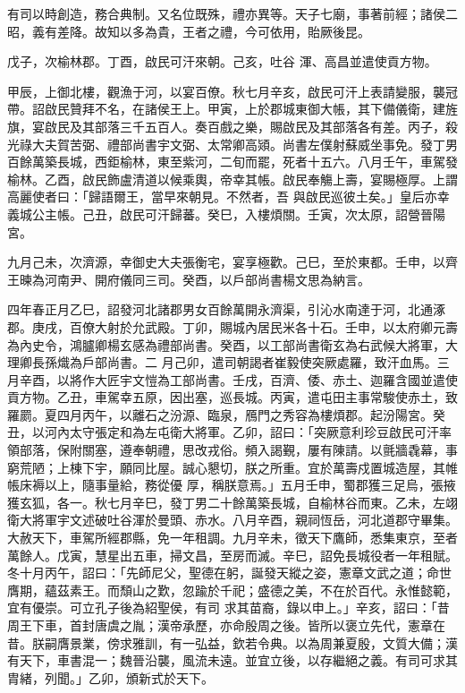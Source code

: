 \begin{pinyinscope}
 有司以時創造，務合典制。又名位既殊，禮亦異等。天子七廟，事著前經；諸侯二昭，義有差降。故知以多為貴，王者之禮，今可依用，貽厥後昆。



 戊子，次榆林郡。丁酉，啟民可汗來朝。己亥，吐谷
 渾、高昌並遣使貢方物。



 甲辰，上御北樓，觀漁于河，以宴百僚。秋七月辛亥，啟民可汗上表請變服，襲冠帶。詔啟民贊拜不名，在諸侯王上。甲寅，上於郡城東御大帳，其下備儀衛，建旌旗，宴啟民及其部落三千五百人。奏百戲之樂，賜啟民及其部落各有差。丙子，殺光祿大夫賀苦弼、禮部尚書宇文弼、太常卿高熲。尚書左僕射蘇威坐事免。發丁男百餘萬築長城，西鉅榆林，東至紫河，二旬而罷，死者十五六。八月壬午，車駕發榆林。乙酉，啟民飾盧清道以候乘輿，帝幸其帳。啟民奉觴上壽，宴賜極厚。上謂高麗使者曰：「歸語爾王，當早來朝見。不然者，吾
 與啟民巡彼土矣。」皇后亦幸義城公主帳。己丑，啟民可汗歸蕃。癸巳，入樓煩關。壬寅，次太原，詔營晉陽宮。



 九月己未，次濟源，幸御史大夫張衡宅，宴享極歡。己巳，至於東都。壬申，以齊王暕為河南尹、開府儀同三司。癸酉，以戶部尚書楊文思為納言。



 四年春正月乙巳，詔發河北諸郡男女百餘萬開永濟渠，引沁水南達于河，北通涿郡。庚戌，百僚大射於允武殿。丁卯，賜城內居民米各十石。壬申，以太府卿元壽為內史令，鴻臚卿楊玄感為禮部尚書。癸酉，以工部尚書衛玄為右武候大將軍，大理卿長孫熾為戶部尚書。二
 月己卯，遣司朝謁者崔毅使突厥處羅，致汗血馬。三月辛酉，以將作大匠宇文愷為工部尚書。壬戌，百濟、倭、赤土、迦羅含國並遣使貢方物。乙丑，車駕幸五原，因出塞，巡長城。丙寅，遣屯田主事常駿使赤土，致羅罽。夏四月丙午，以離石之汾源、臨泉，鴈門之秀容為樓煩郡。起汾陽宮。癸丑，以河內太守張定和為左屯衛大將軍。乙卯，詔曰：「突厥意利珍豆啟民可汗率領部落，保附關塞，遵奉朝禮，思改戎俗。頻入謁覲，屢有陳請。以氈牆毳幕，事窮荒陋；上棟下宇，願同比屋。誠心懇切，朕之所重。宜於萬壽戍置城造屋，其帷帳床褥以上，隨事量給，務從優
 厚，稱朕意焉。」五月壬申，蜀郡獲三足烏，張掖獲玄狐，各一。秋七月辛巳，發丁男二十餘萬築長城，自榆林谷而東。乙未，左翊衛大將軍宇文述破吐谷渾於曼頭、赤水。八月辛酉，親祠恆岳，河北道郡守畢集。大赦天下，車駕所經郡縣，免一年租調。九月辛未，徵天下鷹師，悉集東京，至者萬餘人。戊寅，慧星出五車，掃文昌，至房而滅。辛巳，詔免長城役者一年租賦。冬十月丙午，詔曰：「先師尼父，聖德在躬，誕發天縱之姿，憲章文武之道；命世膺期，蘊茲素王。而頹山之歎，忽踰於千祀；盛德之美，不在於百代。永惟懿範，宜有優崇。可立孔子後為紹聖侯，有司
 求其苗裔，錄以申上。」辛亥，詔曰：「昔周王下車，首封唐虞之胤；漢帝承歷，亦命殷周之後。皆所以褒立先代，憲章在昔。朕嗣膺景業，傍求雅訓，有一弘益，欽若令典。以為周兼夏殷，文質大備；漢有天下，車書混一；魏晉沿襲，風流未遠。並宜立後，以存繼絕之義。有司可求其胄緒，列聞。」乙卯，頒新式於天下。




\end{pinyinscope}
